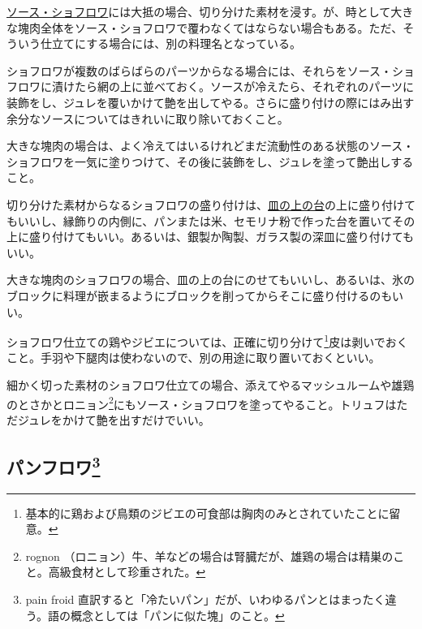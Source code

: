 

\protect\hyperlink{sauce-chaud-froid-ordinaire}{ソース・ショフロワ}には大抵の場合、切り分けた素材を浸す。が、時として大きな塊肉全体をソース・ショフロワで覆わなくてはならない場合もある。ただ、そういう仕立てにする場合には、別の料理名となっている。

ショフロワが複数のばらばらのパーツからなる場合には、それらをソース・ショフロワに漬けたら網の上に並べておく。ソースが冷えたら、それぞれのパーツに装飾をし、ジュレを覆いかけて艶を出してやる。さらに盛り付けの際にはみ出す余分なソースについてはきれいに取り除いておくこと。

大きな塊肉の場合は、よく冷えてはいるけれどまだ流動性のある状態のソース・ショフロワを一気に塗りつけて、その後に装飾をし、ジュレを塗って艶出しすること。

切り分けた素材からなるショフロワの盛り付けは、\protect\hyperlink{fonds-de-plats}{皿の上の台}の上に盛り付けてもいいし、縁飾りの内側に、パンまたは米、セモリナ粉で作った台を置いてその上に盛り付けてもいい。あるいは、銀製か陶製、ガラス製の深皿に盛り付けてもいい。

大きな塊肉のショフロワの場合、皿の上の台にのせてもいいし、あるいは、氷のブロックに料理が嵌まるようにブロックを削ってからそこに盛り付けるのもいい。

ショフロワ仕立ての鶏やジビエについては、正確に切り分けて\footnote{基本的に鶏および鳥類のジビエの可食部は胸肉のみとされていたことに留意。}皮は剥いでおくこと。手羽や下腿肉は使わないので、別の用途に取り置いておくといい。

細かく切った素材のショフロワ仕立ての場合、添えてやるマッシュルームや雄鶏のとさかとロニョン\footnote{rognon
  （ロニョン）牛、羊などの場合は腎臓だが、雄鶏の場合は精巣のこと。高級食材として珍重された。}にもソース・ショフロワを塗ってやること。トリュフはただジュレをかけて艶を出すだけでいい。

\hypertarget{pains-froids}{%
\subsection[パンフロワ]{\texorpdfstring{パンフロワ\footnote{pain froid
  直訳すると「冷たいパン」だが、いわゆるパンとはまったく違う。語の概念としては「パンに似た塊」のこと。}}{パンフロワ}}\label{pains-froids}}

